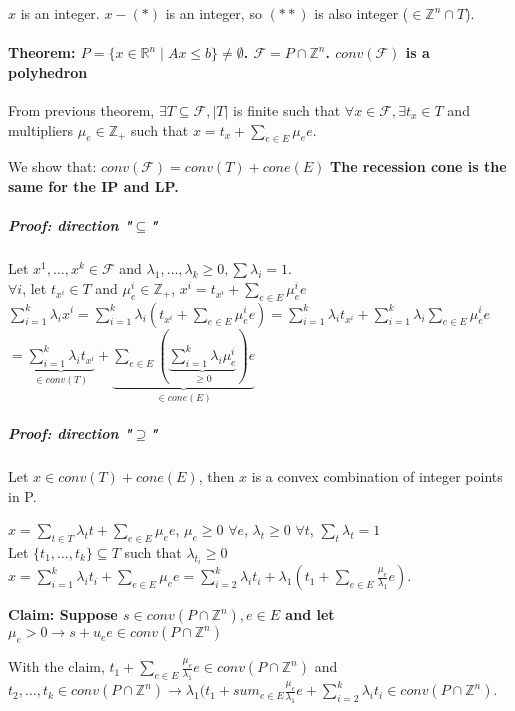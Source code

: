 \documentclass[main]{subfiles}
\begin{document}
$x$ is an integer. $x - (*)$ is an integer, so $(**)$ is also integer ($\in
\mathbb{Z}^n \cap T$).

\paragraph{Theorem: $P = \{ x \in \mathbb{R}^n \mid Ax \leq b\} \neq
\emptyset$. $\mathcal{F} = P \cap \mathbb{Z}^n$. $conv(\mathcal{F})$ is a
polyhedron}

From previous theorem, $\exists T \subseteq \mathcal{F}, |T|$ is finite such
that $\forall x \in \mathcal{F}, \exists t_x \in T$ and multipliers $\mu_e \in
\mathbb{Z}_+$ such that $x = t_x + \sum_{e \in E} \mu_e e$.

We show that: $conv(\mathcal{F}) = conv(T) + cone(E)$
\textbf{The recession cone is the same for the IP and LP.}

\subparagraph{Proof: direction "$\subseteq$"}
Let $x^1, \dots, x^k \in \mathcal{F}$ and $\lambda_1, \dots, \lambda_k \geq 0,
\sum \lambda_i = 1$.\\
$\forall i$, let $t_{x^i} \in T$ and $\mu_e^i \in \mathbb{Z}_+$, $x^i = t_{x^i}
+ \sum_{e \in E} \mu_e^i e$\\
$\sum_{i = 1}^{k} \lambda_i x^i = \sum_{i = 1}^{k} \lambda_i (t_{x^i} + \sum_{e
\in E} \mu_e^i e) = \sum_{i =1}^k \lambda_i t_{x^i} + \sum_{i=1}^k \lambda_i
\sum_{e \in E} \mu_e^i e$\\
$= \underbrace{ \sum_{i=1}^k \lambda_i t_{x^i}}_{\in conv(T)} +
\underbrace{\sum_{e \in E}(\underbrace{\sum_{i =1}^k \lambda_i \mu_e^i}_{\geq
0})e}_{\in cone(E)}$

\subparagraph{Proof: direction "$\supseteq$"}
Let $x \in conv(T) + cone(E)$, then $x$ is a convex combination of integer
points in P.

$x = \sum_{t \in T} \lambda_t t + \sum_{e \in E} \mu_e e$, $\mu_e \geq 0$
$\forall e$, $\lambda_t \geq 0$ $\forall t$, $\sum_{t}\lambda_t = 1$\\
Let $\{t_1, \dots, t_k\} \subseteq T$ such that $\lambda_{t_i} \geq 0$\\
$x = \sum_{i=1}^k \lambda_i t_i + \sum_{e \in E} \mu_e e = \sum_{i=2}^k
\lambda_i t_i + \lambda_1 (t_1 + \sum_{e \in E} \frac{\mu_e}{\lambda_1} e)$.

\textbf{Claim: Suppose $s \in conv(P \cap \mathbb{Z}^n), e \in E$ and let
$\mu_e > 0 \rightarrow s + u_e e \in conv(P \cap \mathbb{Z}^n)$}

With the claim, $t_1 + \sum_{e \in E} \frac{\mu_e}{\lambda_1}e \in conv(P \cap
\mathbb{Z}^n)$ and $t_2, \dots, t_k \in conv(P \cap \mathbb{Z}^n) \rightarrow
\lambda_1(t_1 + sum_{e \in E}\frac{\mu_e}{\lambda_1}e + \sum_{i =2}^k \lambda_i
t_i \in conv(P \cap \mathbb{Z}^n)$.
\end{document}
